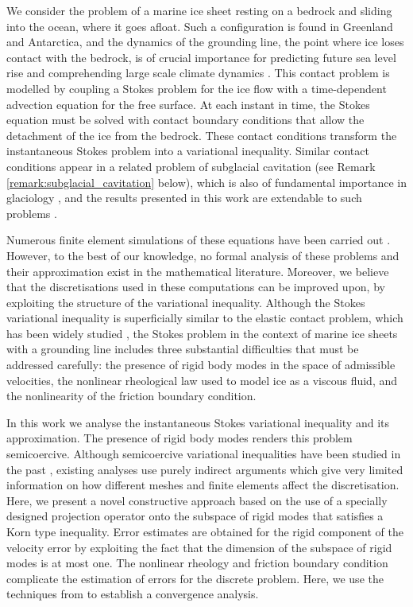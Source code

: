\documentclass[onefignum,onetabnum]{siamart190516}
\begin{document}
We consider the problem of a marine ice sheet resting on a bedrock and sliding into the ocean, where it goes afloat. Such a configuration is found in Greenland and Antarctica, and the dynamics of the grounding line, the point where ice loses contact with the bedrock, is of crucial importance for predicting future sea level rise and comprehending large scale climate dynamics \cite{weertman1974,schoof2007b,ritz2015,garbe2020}. This contact problem is modelled by coupling a Stokes problem for the ice flow with a time-dependent advection equation for the free surface. At each instant in time, the Stokes equation must be solved with contact boundary conditions that allow the detachment of the ice from the bedrock. These contact conditions transform the instantaneous Stokes problem into a variational inequality. Similar contact conditions appear in a related problem of subglacial cavitation (see Remark \ref{remark:subglacial_cavitation} below), which is also of fundamental importance in glaciology \cite{fowler1986, schoof2005, zoet2016}, and the results presented in this work are extendable to such problems \cite{dediego2022}.

Numerous finite element simulations of these equations have been carried out \cite{durand2009, favier2012, stubblefield2021}. However, to the best of our knowledge, no formal analysis of these problems and their approximation exist in the mathematical literature. Moreover, we believe that the discretisations used in these computations can be improved upon, by exploiting the structure of the variational inequality. Although the Stokes variational inequality is superficially similar to the elastic contact problem, which has been widely studied \cite{kikuchi1988,haslinger1996}, the Stokes problem in the context of marine ice sheets with a grounding line includes three substantial difficulties that must be addressed carefully: the presence of rigid body modes in the space of admissible velocities, the nonlinear rheological law used to model ice as a viscous fluid, and the nonlinearity of the friction boundary condition.

In this work we analyse the instantaneous Stokes variational inequality and its approximation. The presence of rigid body modes renders this problem semicoercive. Although semicoercive variational inequalities have been studied in the past \cite{gwinner1991, spann1994, adly2000}, existing analyses use purely indirect arguments which give very limited information on how different meshes and finite elements affect the discretisation. Here, we present a novel constructive approach based on the use of a specially designed projection operator onto the subspace of rigid modes that satisfies a Korn type inequality. Error estimates are obtained for the rigid component of the velocity error by exploiting the fact that the dimension of the subspace of rigid modes is at most one. The nonlinear rheology and friction boundary condition complicate the estimation of errors for the discrete problem. Here, we use the techniques from \cite{belenki2012,hirn2013} to establish a convergence analysis. 
\end{document}
